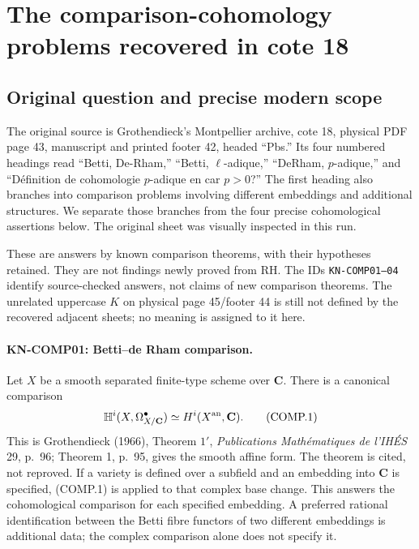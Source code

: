 \section{The comparison-cohomology problems recovered in cote 18}

\subsection{Original question and precise modern scope}
The original source is Grothendieck's Montpellier archive, cote 18,
physical PDF page 43, manuscript and printed footer 42, headed
``Pbs.''  Its four numbered headings read ``Betti, De-Rham,''
``Betti, $\ell$-adique,'' ``DeRham, $p$-adique,'' and
``D\'efinition de cohomologie $p$-adique en car $p>0$?''
The first heading also branches into comparison problems involving
different embeddings and additional structures.  We separate those
branches from the four precise cohomological assertions below.
The original sheet was visually inspected in this run.

These are answers by known comparison theorems, with their hypotheses
retained.  They are not findings newly proved from RH.  The IDs
\texttt{KN-COMP01--04} identify source-checked answers, not claims of
new comparison theorems.  The unrelated uppercase $K$ on physical
page 45/footer 44 is still not defined by the recovered adjacent
sheets; no meaning is assigned to it here.

\paragraph{KN-COMP01: Betti--de Rham comparison.}
Let $X$ be a smooth separated finite-type scheme over $\mathbf C$.
There is a canonical comparison
\[
 \mathbb H^i(X,\Omega^\bullet_{X/\mathbf C})
       \simeq H^i(X^{\rm an},\mathbf C).
 \tag{COMP.1}
\]
This is Grothendieck (1966), Theorem $1'$,
\emph{Publications Math\'ematiques de l'IH\'ES} 29, p.~96;
Theorem 1, p.~95, gives the smooth affine form.  The theorem is
cited, not reproved.  If a variety is defined over a subfield and
an embedding into $\mathbf C$ is specified, (COMP.1) is applied to
that complex base change.  This answers the cohomological comparison
for each specified embedding.  A preferred rational identification
between the Betti fibre functors of two different embeddings is
additional data; the complex comparison alone does not specify it.

